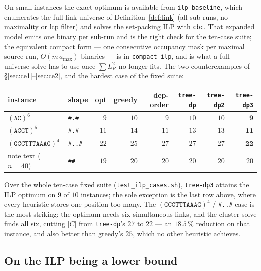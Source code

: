 \documentclass[11pt,a4paper]{article}
\theoremstyle{definition}
\theoremstyle{plain}
\theoremstyle{remark}
\begin{document}
On small instances the exact optimum is available from
\texttt{ilp\_baseline}, which enumerates the full link universe of
Definition~\ref{def:link} (all sub-runs, no maximality or lcp filter) and
solves the set-packing ILP with \texttt{cbc}. That expanded model emits
one binary per sub-run and is the right check for the ten-case suite;
the equivalent compact form --- one consecutive occupancy mask per
maximal source run, $O(m\,a_{\max})$ binaries --- is in
\texttt{compact\_ilp}, and is what a full-universe solve has to use once
$\sum L_R^2$ no longer fits. The two counterexamples of
\S\ref{sec:ce1}--\ref{sec:ce2}, and the hardest case of the fixed
suite:

\begin{center}
\begin{tabular}{@{}llrrrrrr@{}}
\toprule
instance & shape & opt & greedy & dep-order & \texttt{tree-dp} & \texttt{tree-dp2} & \texttt{tree-dp3} \\
\midrule
$(\mathtt{AC})^6$              & \texttt{\#.\#}  & $9$  & $10$ & $9$  & $10$ & $10$ & $\mathbf{9}$ \\
$(\mathtt{ACGT})^5$            & \texttt{\#.\#}  & $11$ & $14$ & $11$ & $13$ & $13$ & $\mathbf{11}$ \\
$(\mathtt{GCCTTTAAAG})^4$      & \texttt{\#..\#} & $22$ & $25$ & $27$ & $27$ & $27$ & $\mathbf{22}$ \\
note text ($n=40$)             & \texttt{\#\#}   & $19$ & $20$ & $20$ & $20$ & $20$ & $20$ \\
\bottomrule
\end{tabular}
\end{center}

Over the whole ten-case fixed suite (\texttt{test\_ilp\_cases.sh}),
\texttt{tree-dp3} attains the ILP optimum on $9$ of $10$ instances; the
sole exception is the last row above, where every heuristic stores one
position too many. The $(\mathtt{GCCTTTAAAG})^4$ / \texttt{\#..\#} case is
the most striking: the optimum needs six simultaneous links, and the
cluster solve finds all six, cutting $|C|$ from \texttt{tree-dp}'s $27$ to
$22$ --- an $18.5\,\%$ reduction on that instance, and also better than
greedy's $25$, which no other heuristic achieves.

\subsection{On the ILP being a lower bound}
\label{sec:ilpcaveat}
\end{document}
